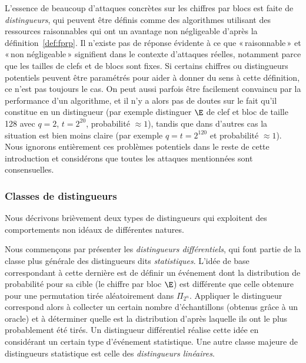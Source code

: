 L'essence de beaucoup d'attaques concrètes sur les chiffres par blocs est faite de \emph{distingueurs}, qui peuvent être définis comme des algorithmes utilisant des ressources
raisonnables qui ont un avantage non négligeable d'après la définition~\ref{def:fprp}.
Il n'existe pas de réponse évidente à ce que «\,raisonnable\,» et «\,non négligeable\,» signifient dans le contexte d'attaques réelles, notamment parce que les tailles de clefs
et de blocs sont fixes. Si certains chiffres ou distingueurs potentiels peuvent être paramétrés pour aider à donner du sens à cette définition, ce n'est pas toujours le cas.
On peut aussi parfois être facilement convaincu par la performance d'un algorithme, et il n'y a alors pas de doutes sur le fait qu'il constitue en un distingueur
(par exemple distinguer $\E$ de clef et bloc de taille 128 avec $q = 2$, $t = 2^{20}$, probabilité $\approx 1$), tandis que dans d'autres cas la situation est bien
moins claire (par exemple $q = t = 2^{120}$ et probabilité $\approx 1$). Nous ignorons entièrement ces problèmes potentiels dans le reste de cette introduction et considérons
que toutes les attaques mentionnées sont consensuelles.

\subsubsection{Classes de distingueurs}

Nous décrivons brièvement deux types de distingueurs qui exploitent des comportements non idéaux de différentes natures.

\bigskip

Nous commençons par présenter les \emph{distingueurs différentiels}, qui font partie de la classe plus générale des distingueurs
dits \emph{statistiques}.
L'idée de base correspondant à cette dernière est de définir un événement dont la distribution de probabilité pour sa cible
(le chiffre par bloc $\E$) est différente que celle obtenure pour une permutation tirée aléatoirement dans $\Pi_{2^n}$.
Appliquer le distingueur correspond alors à collecter un certain nombre d'échantillons (obtenus grâce à un oracle)
et à déterminer quelle est la distribution d'après laquelle ils ont le plus probablement été tirés.
Un distingueur différentiel réalise cette idée en considérant un certain type d'événement statistique. Une autre classe
majeure de distingueurs statistique est celle des \emph{distingueurs linéaires}.

